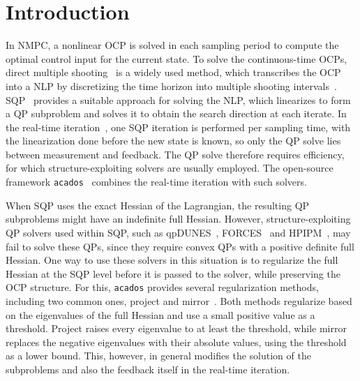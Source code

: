 \documentclass[class=scrbook, crop=false]{standalone}
\begin{document}
\chapter{Introduction}
\label{Chapter::Introduction}

In \gls{NMPC}, a nonlinear \gls{OCP} is solved in each sampling period 
to compute the optimal control input for the current state.
To solve the continuous-time \glspl{OCP}, 
direct multiple shooting~\cite{bock1984multiple} is a widely used method,
which transcribes the \gls{OCP} into a \gls{NLP} by discretizing the time horizon into multiple shooting intervals~\cite{Diehl2018}.
\Gls{SQP}~\cite{nocedal2006numerical} provides a suitable approach for solving the \gls{NLP},
which linearizes to form a \gls{QP} subproblem and solves it to obtain the search direction at each iterate.
In the real-time iteration~\cite{diehl2005real},
one \gls{SQP} iteration is performed per sampling time, with the linearization done before the new state is known,
so only the \gls{QP} solve lies between measurement and feedback.
The \gls{QP} solve therefore requires efficiency, for which structure-exploiting solvers are usually employed.
The open-source framework \texttt{acados}~\cite{verschueren2020acadosmodularopensourceframework}
combines the real-time iteration with such solvers.

When \gls{SQP} uses the exact Hessian of the Lagrangian, 
the resulting \gls{QP} subproblems might have an indefinite full Hessian.
However, structure-exploiting \gls{QP} solvers used within \gls{SQP}, 
such as qpDUNES~\cite{frasch2015parallel}, FORCES~\cite{domahidi2012efficient} and HPIPM~\cite{frison2020hpipmhighperformancequadraticprogramming}, 
may fail to solve these \glspl{QP}, since they require convex \glspl{QP} with a positive definite full Hessian.
One way to use these solvers in this situation is to regularize the full Hessian 
at the \gls{SQP} level before it is passed to the solver, while preserving the \gls{OCP} structure.
For this, \texttt{acados} provides several regularization methods, including two common ones, project and mirror~\cite{verschueren2017sparsity}.
Both methods regularize based on the eigenvalues of the full Hessian and use a small positive value as a threshold.
Project raises every eigenvalue to at least the threshold,
while mirror replaces the negative eigenvalues with their absolute values, using the threshold as a lower bound.
This, however, in general modifies the solution of the subproblems and also the feedback itself in the real-time iteration.
\end{document}
